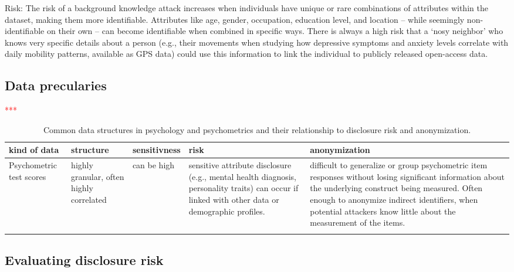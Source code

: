 \documentclass{article}
\begin{document}
Risk: The risk of a background knowledge attack increases when individuals have unique or rare combinations of attributes within the dataset, making them more identifiable. Attributes like age, gender, occupation, education level, and location -- while seemingly non-identifiable on their own -- can become identifiable when combined in specific ways. There is always a high risk that a ‘nosy neighbor’ who knows very specific details about a person (e.g., their movements when studying how depressive symptoms and anxiety levels correlate with daily mobility patterns, available as GPS data) could use this information to link the individual to publicly released open-access data.


\subsection{Data precularies}

\textcolor{red}{***}

\begin{table}[]
\begin{small}

    \centering
    \begin{tabular}{p{2cm}|p{2cm}|p{2cm}|p{3cm}|p{5cm}|}
    \toprule
       kind of data  & structure  & sensitivness & risk & anonymization \\
       \midrule
       Psychometric test scores   & highly granular, often highly correlated & can be high & sensitive attribute disclosure (e.g., mental health diagnosis, personality traits) can occur if linked with other data or demographic profiles. & difficult to generalize or group psychometric item responses without losing significant information about the underlying construct being measured. Often enough to anonymize indirect identifiers, when potential attackers know little about the measurement of the items. \\
       \midrule
       &&&& \\
       \bottomrule
    \end{tabular}
    \caption{Common data structures in psychology and psychometrics and their relationship to disclosure risk and anonymization.}
    \label{tab:my_label}

\end{small}
\end{table}



\subsection{Evaluating disclosure risk}
\end{document}
